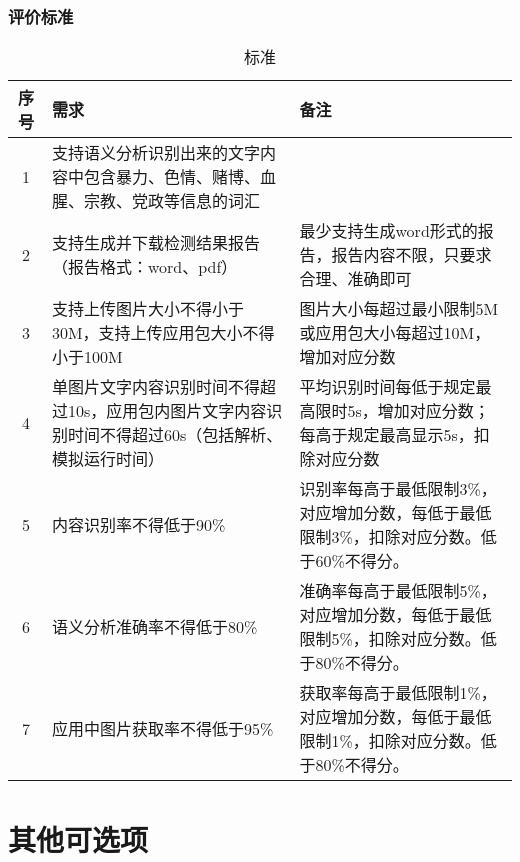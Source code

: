 \documentclass[UTF8]{ctexart}
\begin{document}
			\subsubsection{评价标准}
				\begin{table}
					\caption{标准}
					\centering
					\begin{tabular}{cp{5.5cm}p{5.5cm}}
						\toprule[1.5pt]
						\textbf{序号} & \textbf{需求} & \textbf{备注}\\
						\midrule[1pt]
						1 & 支持语义分析识别出来的文字内容中包含暴力、色情、赌博、血腥、宗教、党政等信息的词汇 & \\
						2 & 支持生成并下载检测结果报告（报告格式：word、pdf） & 最少支持生成word形式的报告，报告内容不限，只要求合理、准确即可\\
						3 & 支持上传图片大小不得小于30M，支持上传应用包大小不得小于100M & 图片大小每超过最小限制5M或应用包大小每超过10M，增加对应分数\\
						4 & 单图片文字内容识别时间不得超过10s，应用包内图片文字内容识别时间不得超过60s（包括解析、模拟运行时间） & 平均识别时间每低于规定最高限时5s，增加对应分数；每高于规定最高显示5s，扣除对应分数\\
						5 & 内容识别率不得低于90\% & 识别率每高于最低限制3\%，对应增加分数，每低于最低限制3\%，扣除对应分数。低于60\%不得分。\\
						6 & 语义分析准确率不得低于80\% & 准确率每高于最低限制5\%，对应增加分数，每低于最低限制5\%，扣除对应分数。低于80\%不得分。\\
						7 & 应用中图片获取率不得低于95\% & 获取率每高于最低限制1\%，对应增加分数，每低于最低限制1\%，扣除对应分数。低于80\%不得分。\\
						\bottomrule[1.5pt]
					\end{tabular}
				\end{table}
	
	\section{其他可选项}
\end{document}
